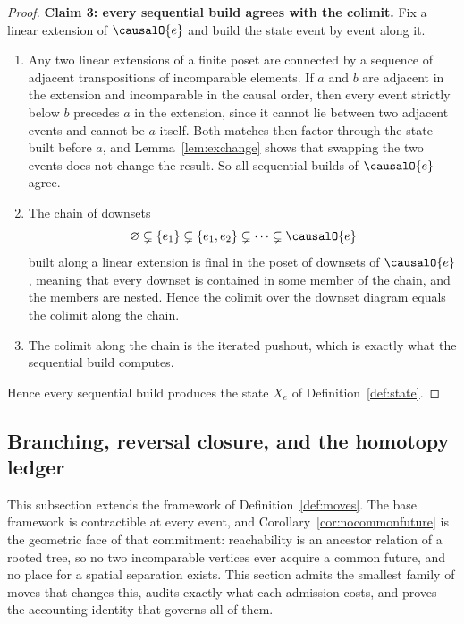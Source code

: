 \begin{proof}
\medskip
\noindent\textbf{Claim 3: every sequential build agrees with the colimit.}
Fix a linear extension of $\causalO{e}$ and build the state event by event along it.
\begin{enumerate}
  \item Any two linear extensions of a finite poset are connected by a sequence of adjacent transpositions of incomparable elements.
        If $a$ and $b$ are adjacent in the extension and incomparable in the causal order, then every event strictly below $b$ precedes $a$ in the extension, since it cannot lie between two adjacent events and cannot be $a$ itself.
        Both matches then factor through the state built before $a$, and Lemma~\ref{lem:exchange} shows that swapping the two events does not change the result.
        So all sequential builds of $\causalO{e}$ agree.
  \item The chain of downsets
        \[
          \varnothing \subsetneq \{e_1\} \subsetneq \{e_1, e_2\} \subsetneq \dots \subsetneq \causalO{e}
        \]
        built along a linear extension is final in the poset of downsets of $\causalO{e}$, meaning that every downset is contained in some member of the chain, and the members are nested.
        Hence the colimit over the downset diagram equals the colimit along the chain.
  \item The colimit along the chain is the iterated pushout, which is exactly what the sequential build computes.
\end{enumerate}
Hence every sequential build produces the state $X_e$ of Definition~\ref{def:state}.
\end{proof}

\subsection{Branching, reversal closure, and the homotopy ledger}
\label{sec:kfold}

This subsection extends the framework of Definition~\ref{def:moves}.
The base framework is contractible at every event, and Corollary~\ref{cor:nocommonfuture} is the geometric face of that commitment: reachability is an ancestor relation of a rooted tree, so no two incomparable vertices ever acquire a common future, and no place for a spatial separation exists.
This section admits the smallest family of moves that changes this, audits exactly what each admission costs, and proves the accounting identity that governs all of them.

